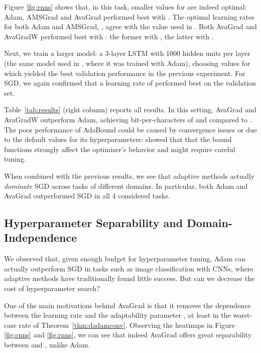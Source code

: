 \documentclass{article}
\newcommand{\thmref}[1]{Theorem~\ref{#1}}
\begin{document}
Figure \ref{fig:rnns} shows that, in
this task, smaller values for  are indeed optimal: Adam, AMSGrad and
AvaGrad performed best with . The optimal learning rates for both Adam and AMSGrad, , agree with the value used in \citet{awd}. Both AvaGrad and AvaGradW performed best with : the former with , the latter with .

Next, we train a larger model: a 3-layer
LSTM with 1000 hidden units per layer (the same model used in \citet{awd},
where it was trained with Adam),
choosing values for  which yielded the best validation performance in
the previous experiment. For SGD, we again confirmed that a learning rate of  performed best on the validation set. 

Table~\ref{tab:results} (right column) reports all
results. In this setting, AvaGrad and AvaGradW outperform Adam, achieving
bit-per-characters of  and  compared to . The poor performance of AdaBound could be caused by convergence issues or due to the default values for its hyperparameters: \citet{adabound2} showed that that the bound functions strongly affect the optimizer's behavior and might require careful tuning.

When combined with the previous results, we see that adaptive methods actually \emph{dominate} SGD across tasks of different domains. In particular, both Adam and AvaGrad outperformed SGD in all 4 considered tasks.


\subsection{Hyperparameter Separability and Domain-Independence}

We observed that, given enough budget for hyperparameter tuning, Adam can actually outperform SGD in tasks such as image classification with CNNs, where adaptive methods have traditionally found little success. But can we decrease the cost of hyperparameter search?

One of the main motivations behind AvaGrad is that it removes the dependence
between the learning rate  and the adaptability parameter ,
at least in the worst-case rate of \thmref{thm:dadamconv}.  Observing the
heatmaps in Figure \ref{fig:cnns} and
\ref{fig:rnns}, we can see that indeed AvaGrad offers great
separability between  and , unlike Adam. 
\end{document}
